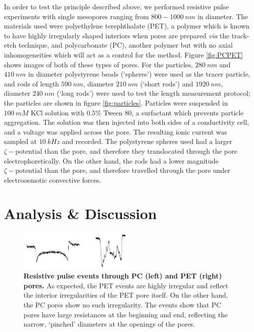 	    
		In order to test the principle described above, we performed resistive pulse experiments with single mesopores ranging from $800-\SI{1000}{nm}$ in diameter. The materials used were polyethylene terephthalate (PET), a polymer which is known to have highly irregularly shaped interiors when pores are prepared \textit{via} the track-etch technique, and polycarbonate (PC), another polymer but with no axial inhomogeneities which will act as a control for the method. Figure \ref{fig:PCPET} shows images of both of these types of pores. For the particles, $\SI{280}{nm}$ and $\SI{410}{nm}$ in diameter polystyrene beads (`spheres') were used as the tracer particle, and rods of length $\SI{590}{nm}$, diameter $\SI{210}{nm}$ (`short rods') and $\SI{1920}{nm}$, diameter $\SI{240}{nm}$ (`long rods') were used to test the length measurement protocol; the particles are shown in figure \ref{fig:particles}. Particles were suspended in $\SI{100}{mM}$ KCl solution with $0.5\%$ Tween 80, a surfactant which prevents particle aggregation. The solution was then injected into both sides of a conductivity cell, and a voltage was applied across the pore. The resulting ionic current was sampled at $\SI{10}{kHz}$ and recorded. The polystyrene spheres used had a larger $\zeta-\mathrm{potential}$ than the pore, and therefore they translocated through the pore electrophoretically. On the other hand, the rods had a lower magnitude $\zeta-\mathrm{potential}$ than the pore, and therefore travelled through the pore under electroosmotic convective forces. 
		
	
	\section{Analysis \& Discussion}
	
	
		\begin{figure}
			\includegraphics[width=0.5\textwidth]{PCPETevents}
			\caption{\textbf{Resistive pulse events through PC (left) and PET (right) pores.} As expected, the PET events are highly irregular and reflect the interior irregularities of the PET pore itself. On the other hand, the PC pores show no such irregularity. The events show that PC pores have large resistances at the beginning and end, reflecting the narrow, `pinched' diameters at the openings of the pores.}
			\label{fig:PCPETevents}
		\end{figure}

